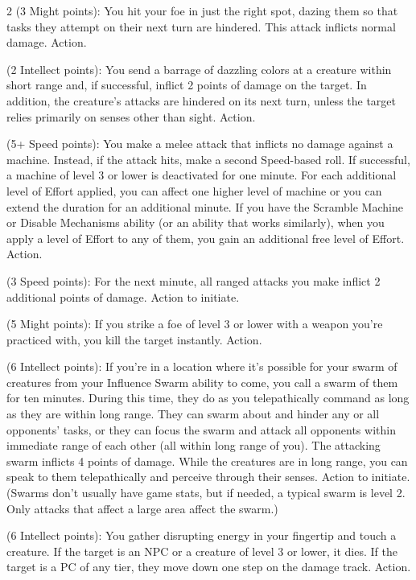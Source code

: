 \begin{multicols}{2}
 (3 Might points): You hit your foe in just the right spot, dazing them so that tasks they attempt on their next turn are hindered. This attack inflicts normal damage. Action. 

 (2 Intellect points): You send a barrage of dazzling colors at a creature within short range and, if successful, inflict 2 points of damage on the target. In addition, the creature’s attacks are hindered on its next turn, unless the target relies primarily on senses other than sight. Action.

 (5+ Speed points): You make a melee attack that inflicts no damage against a machine. Instead, if the attack hits, make a second Speed-based roll. If successful, a machine of level 3 or lower is deactivated for one minute. For each additional level of Effort applied, you can affect one higher level of machine or you can extend the duration for an additional minute. If you have the Scramble Machine or Disable Mechanisms ability (or an ability that works similarly), when you apply a level of Effort to any of them, you gain an additional free level of Effort. Action.

 (3 Speed points): For the next minute, all ranged attacks you make inflict 2 additional points of damage. Action to initiate. 

 (5 Might points): If you strike a foe of level 3 or lower with a weapon you’re practiced with, you kill the target instantly. Action.

 (6 Intellect points): If you’re in a location where it’s possible for your swarm of creatures from your Influence Swarm ability to come, you call a swarm of them for ten minutes. During this time, they do as you telepathically command as long as they are within long range. They can swarm about and hinder any or all opponents’ tasks, or they can focus the swarm and attack all opponents within immediate range of each other (all within long range of you). The attacking swarm inflicts 4 points of damage. While the creatures are in long range, you can speak to them telepathically and perceive through their senses. Action to initiate. (Swarms don’t usually have game stats, but if needed, a typical swarm is level 2. Only attacks that affect a large area affect the swarm.)

 (6 Intellect points): You gather disrupting energy in your fingertip and touch a creature. If the target is an NPC or a creature of level 3 or lower, it dies. If the target is a PC of any tier, they move down one step on the damage track. Action. 


\end{multicols}

